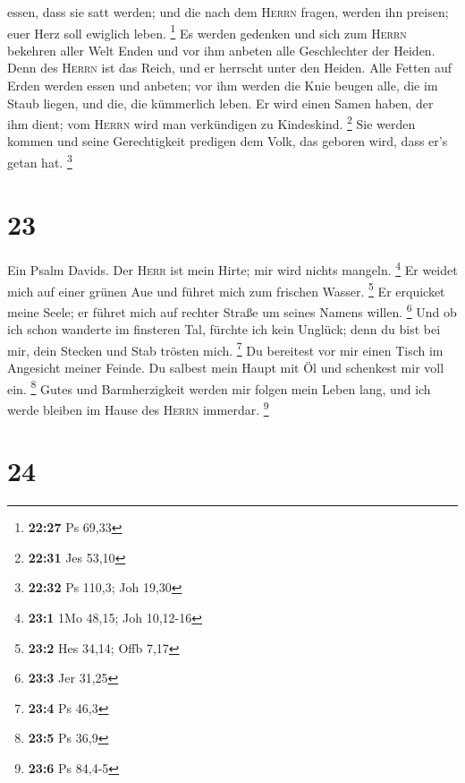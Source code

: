 essen, dass sie satt werden; und die nach dem \textsc{Herrn} fragen,
werden ihn preisen; euer Herz soll ewiglich leben. \footnote{\textbf{22:27}
  Ps 69,33}  Es werden gedenken und sich zum
\textsc{Herrn} bekehren aller Welt Enden und vor ihm anbeten alle
Geschlechter der Heiden.  Denn des \textsc{Herrn} ist das
Reich, und er herrscht unter den Heiden.  Alle Fetten auf
Erden werden essen und anbeten; vor ihm werden die Knie beugen alle, die
im Staub liegen, und die, die kümmerlich leben.  Er wird
einen Samen haben, der ihm dient; vom \textsc{Herrn} wird man
verkündigen zu Kindeskind. \footnote{\textbf{22:31} Jes 53,10}
 Sie werden kommen und seine Gerechtigkeit predigen dem
Volk, das geboren wird, dass er's getan hat. \footnote{\textbf{22:32} Ps
  110,3; Joh 19,30}

\hypertarget{section-9}{%
\section{23}\label{section-9}}

 Ein Psalm Davids. Der \textsc{Herr} ist mein Hirte; mir
wird nichts mangeln. \footnote{\textbf{23:1} 1Mo 48,15; Joh 10,12-16}
 Er weidet mich auf einer grünen Aue und führet mich zum
frischen Wasser. \footnote{\textbf{23:2} Hes 34,14; Offb 7,17}
 Er erquicket meine Seele; er führet mich auf rechter
Straße um seines Namens willen. \footnote{\textbf{23:3} Jer 31,25}
 Und ob ich schon wanderte im finsteren Tal, fürchte ich
kein Unglück; denn du bist bei mir, dein Stecken und Stab trösten mich.
\footnote{\textbf{23:4} Ps 46,3}  Du bereitest vor mir
einen Tisch im Angesicht meiner Feinde. Du salbest mein Haupt mit Öl und
schenkest mir voll ein. \footnote{\textbf{23:5} Ps 36,9} 
Gutes und Barmherzigkeit werden mir folgen mein Leben lang, und ich
werde bleiben im Hause des \textsc{Herrn} immerdar. \footnote{\textbf{23:6}
  Ps 84,4-5}

\hypertarget{section-10}{%
\section{24}\label{section-10}}

